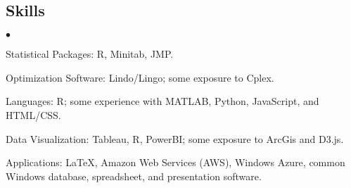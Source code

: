 \documentclass[margin,line]{res}
\newenvironment{list2}{
  \begin{list}{$\bullet$}{%
      \setlength{\itemsep}{0in}
      \setlength{\parsep}{0in} \setlength{\parskip}{0in}
      \setlength{\topsep}{0in} \setlength{\partopsep}{0in} 
      \setlength{\leftmargin}{0.2in}}}{\end{list}}
\begin{document}
\begin{resume}
 
\section{\sc Skills} 
\begin{list2}
	\item Statistical Packages:  R, Minitab, JMP.
	\item Optimization Software: Lindo/Lingo; some exposure to Cplex. 
	\item Languages: R; some experience with MATLAB, Python, JavaScript, and HTML/CSS.
	\item Data Visualization: Tableau, R, PowerBI; some exposure to ArcGis and D3.js.
	\item Applications: \LaTeX, Amazon Web Services (AWS), Windows Azure, common Windows   database, spreadsheet, and presentation software.
\end{list2}


\end{resume}
\end{document}
